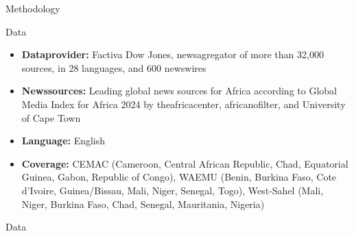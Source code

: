 \documentclass[aspectratio=169,10pt]{beamer}
\begin{document}
\begin{section}[Methodology]{Methodology}

\begin{frame}{Data}\label{data_PI}

    \begin{itemize}
            \item \textbf{Dataprovider:} Factiva Dow Jones, newsagregator of more than 32,000 sources, in 28 languages, and 600 newswires
        \item \textbf{Newssources:} Leading global news sources for Africa according to Global Media Index for Africa 2024 by theafricacenter, africanofilter, and University of Cape Town
        \item \textbf{Language:} English
        \item \textbf{Coverage:} CEMAC (Cameroon, Central African Republic, Chad, Equatorial Guinea, Gabon, Republic of Congo), WAEMU (Benin, Burkina Faso, Cote d’Ivoire, Guinea/Bissau, Mali, Niger, Senegal, Togo), West-Sahel (Mali, Niger, Burkina Faso, Chad, Senegal, Mauritania, Nigeria) \hyperlink{africa_map}{}
    \end{itemize}
    
\end{frame}

\begin{frame}{Data}
  

\end{frame}
\end{section}
\end{document}
